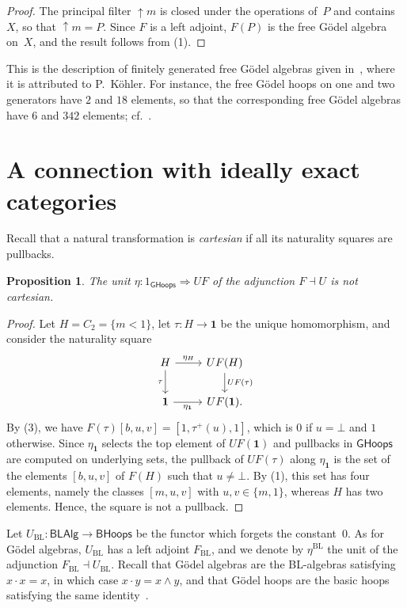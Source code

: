 \documentclass[reqno,a4paper]{amsart}
\theoremstyle{plain}
\newtheorem{proposition}[subsection]{Proposition}
\theoremstyle{definition}
\theoremstyle{remark}
\numberwithin{equation}{section}
\newcommand{\GHoops}{\ensuremath{\mathsf{GHoops}}}
\newcommand{\BHoops}{\ensuremath{\mathsf{BHoops}}}
\newcommand{\BLAlg}{\ensuremath{\mathsf{BLAlg}}}
\newcommand{\one}{\mathbf{1}}
\newcommand{\up}{{\uparrow}}
\begin{document}
\begin{proof}
The principal filter ${\up}m$ is closed under the operations of~$P$ and contains~$X$, so that ${\up}m=P$. Since $F$ is a left adjoint, $F(P)$ is the free G\"odel algebra on~$X$, and the result follows from (1).
\end{proof}

This is the description of finitely generated free G\"odel algebras given in~\cite[Theorem~5.7]{Davey}, where it is attributed to P.~K\"ohler. For instance, the free G\"odel hoops on one and two generators have $2$ and $18$ elements, so that the corresponding free G\"odel algebras have $6$ and $342$ elements; cf.~\cite{Horn}.

\section{A connection with ideally exact categories}\label{SecIdeallyExact}

Recall that a natural transformation is \emph{cartesian} if all its naturality squares are pullbacks.

\begin{proposition}\label{PropNotCartesian}
The unit $\eta\colon 1_{\GHoops}\Rightarrow UF$ of the adjunction $F\dashv U$ is not cartesian.
\end{proposition}

\begin{proof}
Let $H=C_2=\{m<1\}$, let $\tau\colon H\to\one$ be the unique homomorphism, and consider the naturality square
\[
\begin{tikzcd}
H \arrow[r, "\eta_H"] \arrow[d, "\tau"'] & UF(H) \arrow[d, "UF(\tau)"] \\
\one \arrow[r, "\eta_{\one}"'] & UF(\one).
\end{tikzcd}
\]
By (3), we have $F(\tau)[b,u,v]=[1,\tau^+(u),1]$, which is $0$ if $u=\bot$ and $1$ otherwise. Since $\eta_{\one}$ selects the top element of $UF(\one)$ and pullbacks in $\GHoops$ are computed on underlying sets, the pullback of $UF(\tau)$ along $\eta_{\one}$ is the set of the elements $[b,u,v]$ of $F(H)$ such that $u\neq\bot$. By (1), this set has four elements, namely the classes $[m,u,v]$ with $u,v\in\{m,1\}$, whereas $H$ has two elements. Hence, the square is not a pullback.
\end{proof}

Let $U_{\mathrm{BL}}\colon\BLAlg\to\BHoops$ be the functor which forgets the constant~$0$. As for G\"odel algebras, $U_{\mathrm{BL}}$ has a left adjoint $F_{\mathrm{BL}}$, and we denote by $\eta^{\mathrm{BL}}$ the unit of the adjunction $F_{\mathrm{BL}}\dashv U_{\mathrm{BL}}$. Recall that G\"odel algebras are the BL-algebras satisfying $x\cdot x=x$, in which case $x\cdot y=x\wedge y$, and that G\"odel hoops are the basic hoops satisfying the same identity~\cite{AFM,Hajek}.
\end{document}
